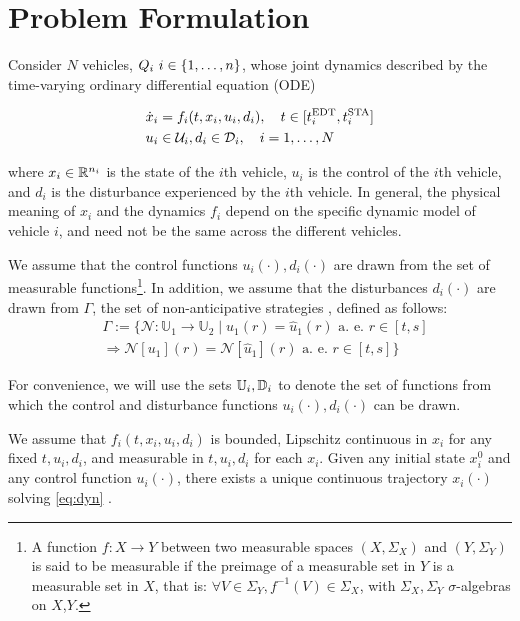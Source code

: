 \section{Problem Formulation \label{sec:formulation}}
Consider $N$ vehicles, $Q_i ~i\in \{1,\ldots,n\}$, whose joint dynamics described by the time-varying ordinary differential equation (ODE)

\begin{equation}
\label{eq:dyn}
\begin{aligned}
\dot{x}_i &= f_i(t, x_i, u_i, d_i), \quad t \in [t^\text{EDT}_i, t^\text{STA}_i] \\
u_i &\in \mathcal{U}_i, d_i \in \mathcal{D}_i, \quad i = 1,\ldots, N
\end{aligned}
\end{equation}

\noindent where $x_i \in \mathbb{R}^{n_i}$ is the state of the $i$th vehicle, $u_i$ is the control of the $i$th vehicle, and $d_i$ is the disturbance experienced by the $i$th vehicle. In general, the physical meaning of $x_i$ and the dynamics $f_i$ depend on the specific dynamic model of vehicle $i$, and need not be the same across the different vehicles.

We assume that the control functions $u_i(\cdot), d_i(\cdot)$ are drawn from the set of measurable functions\footnote{
A function $f:X\to Y$ between two measurable spaces $(X,\Sigma_X)$ and $(Y,\Sigma_Y)$ is said to be measurable if the preimage of a measurable set in $Y$ is a measurable set in $X$, that is: $\forall V\in\Sigma_Y, f^{-1}(V)\in\Sigma_X$, with $\Sigma_X,\Sigma_Y$ $\sigma$-algebras on $X$,$Y$.}. In addition, we assume that the disturbances $d_i(\cdot)$ are drawn from $\Gamma$, the set of non-anticipative strategies \cite{Mitchell05}, defined as follows:
\begin{equation}
\begin{aligned}
& \Gamma := \{\mathcal{N}: \mathbb{U}_1 \rightarrow \mathbb{U}_2 \mid  u_1(r) = \hat{u}_1(r) \text{ a. e. } r\in[t,s] \\
& \Rightarrow \mathcal{N}[u_1](r) = \mathcal{N}[\hat{u}_1](r) \text{ a. e. } r\in[t,s]\}
\end{aligned}
\end{equation}

For convenience, we will use the sets $\mathbb{U}_i, \mathbb{D}_i$ to denote the set of functions from which the control and disturbance functions $u_i(\cdot), d_i(\cdot)$ can be drawn.

We assume that $f_i(t,x_i, u_i, d_i)$ is bounded, Lipschitz continuous in $x_i$ for any fixed $t, u_i, d_i$, and measurable in $t, u_i, d_i$ for each $x_i$. Given any initial state $x_i^0$ and any control function $u_i(\cdot)$, there exists a unique continuous trajectory $x_i(\cdot)$ solving \eqref{eq:dyn} \cite{Coddington55}.

